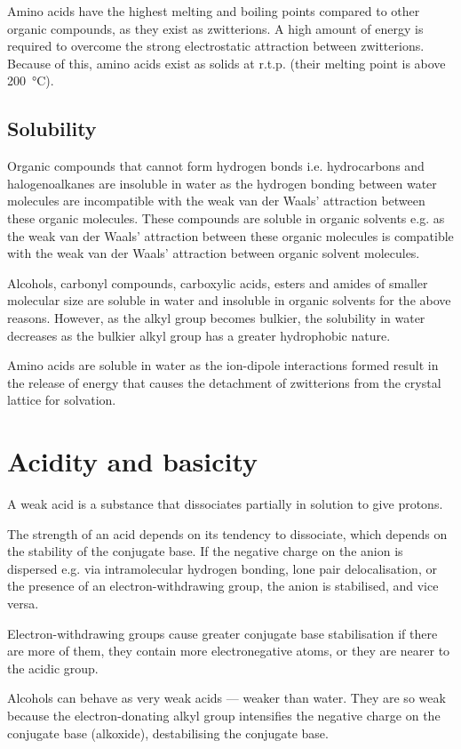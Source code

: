 \documentclass[Chemistry.tex]{subfiles}
\begin{document}
Amino acids have the highest melting and boiling points compared to other organic compounds, as they exist as zwitterions. A high amount of energy is required to overcome the strong electrostatic attraction between zwitterions. Because of this, amino acids exist as solids at r.t.p. (their melting point is above \SI{200}{\celsius}).
\subsection{Solubility}
Organic compounds that cannot form hydrogen bonds i.e. hydrocarbons and halogenoalkanes are insoluble in water as the hydrogen bonding between water molecules are incompatible with the weak van der Waals' attraction between these organic molecules. These compounds are soluble in organic solvents e.g.  as the weak van der Waals' attraction between these organic molecules is compatible with the weak van der Waals' attraction between organic solvent molecules.

Alcohols, carbonyl compounds, carboxylic acids, esters and amides of smaller molecular size are soluble in water and insoluble in organic solvents for the above reasons. However, as the alkyl group becomes bulkier, the solubility in water decreases as the bulkier alkyl group has a greater hydrophobic nature.

Amino acids are soluble in water as the ion-dipole interactions formed result in the release of energy that causes the detachment of zwitterions from the crystal lattice for solvation. \section{Acidity and basicity}
A weak acid is a substance that dissociates partially in solution to give protons.

The strength of an acid depends on its tendency to dissociate, which depends on the stability of the conjugate base. If the negative charge on the anion is dispersed e.g. via intramolecular hydrogen bonding, lone pair delocalisation, or the presence of an electron-withdrawing group, the anion is stabilised, and vice versa.

Electron-withdrawing groups cause greater conjugate base stabilisation if there are more of them, they contain more electronegative atoms, or they are nearer to the acidic group.

Alcohols can behave as very weak acids --- weaker than water. They are so weak because the electron-donating alkyl group intensifies the negative charge on the conjugate base (alkoxide), destabilising the conjugate base.
\end{document}
